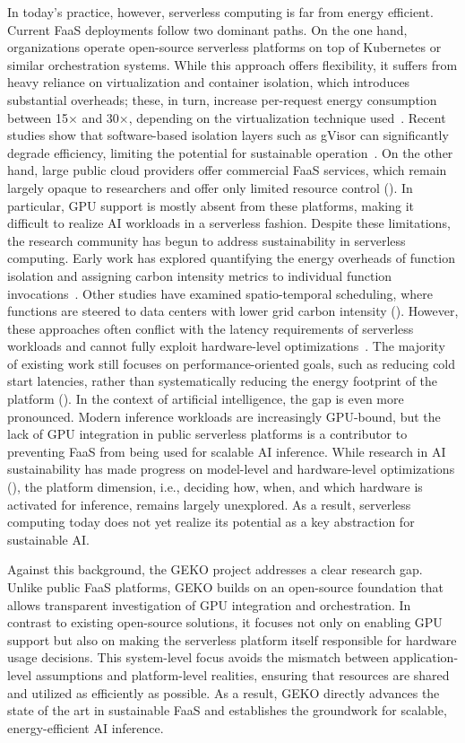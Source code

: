 In today's practice, however, serverless computing is far from energy efficient.
Current FaaS deployments follow two dominant paths. 
On the one hand, organizations operate open-source serverless platforms on top of Kubernetes or similar orchestration systems. 
While this approach offers flexibility, it suffers from heavy reliance on virtualization and container isolation, which introduces substantial overheads; these, in turn, increase per-request energy consumption between 15$\times$ and 30$\times$, depending on the virtualization technique used~\cite{sharma_challenges_2023}.
Recent studies show that software-based isolation layers such as gVisor can significantly degrade efficiency, limiting the potential for sustainable operation~\cite{young_true_nodate}. 
On the other hand, large public cloud providers offer commercial FaaS services, which remain largely opaque to researchers and offer only limited resource control (). 
In particular, GPU support is mostly absent from these platforms, making it difficult to realize AI workloads in a serverless fashion.
Despite these limitations, the research community has begun to address sustainability in serverless computing. 
Early work has explored quantifying the energy overheads of function isolation and assigning carbon intensity metrics to individual function invocations~\cite{sharma_accountable_2024}.
Other studies have examined spatio-temporal scheduling, where functions are steered to data centers with lower grid carbon intensity (). 
However, these approaches often conflict with the latency requirements of serverless workloads and cannot fully exploit hardware-level optimizations~\cite{sukprasert_limitations_2024}. 
The majority of existing work still focuses on performance-oriented goals, such as reducing cold start latencies, rather than systematically reducing the energy footprint of the platform ().
In the context of artificial intelligence, the gap is even more pronounced. 
Modern inference workloads are increasingly GPU-bound, but the lack of GPU integration in public serverless platforms is a contributor to preventing FaaS from being used for scalable AI inference. 
While research in AI sustainability has made progress on model-level and hardware-level optimizations (), the platform dimension, i.e., deciding how, when, and which hardware is activated for inference, remains largely unexplored. 
As a result, serverless computing today does not yet realize its potential as a key abstraction for sustainable AI.

Against this background, the GEKO project addresses a clear research gap.
Unlike public FaaS platforms, GEKO builds on an open-source foundation that allows transparent investigation of GPU integration and orchestration. 
In contrast to existing open-source solutions, it focuses not only on enabling GPU support but also on making the serverless platform itself responsible for hardware usage decisions. 
This system-level focus avoids the mismatch between application-level assumptions and platform-level realities, ensuring that resources are shared and utilized as efficiently as possible. 
As a result, GEKO directly advances the state of the art in sustainable FaaS and establishes the groundwork for scalable, energy-efficient AI inference.
